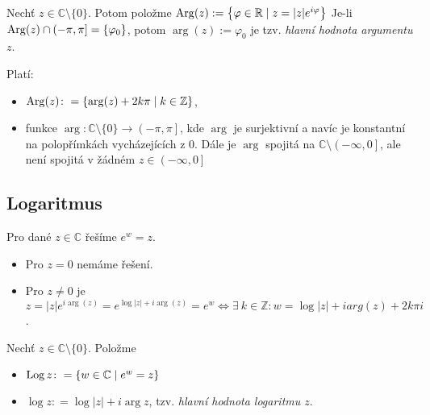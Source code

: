     \begin{notation}
          Nechť $z\in\mathbb{C}\setminus\{0\}$. Potom položme $\operatorname*{Arg}(z):=\left\{\varphi\in\mathbb{R}\mid z=\lvert z \rvert e^{i\varphi}\right\}$ Je-li $\operatorname*{Arg}(z) \cap  (-\pi,\pi]=\{\varphi_0\}$, potom $\arg(z):=\varphi_0$ je tzv. \emph{hlavní hodnota argumentu $z$}. %
    \end{notation}
     
         Platí: 
        \begin{itemize}
            \item $\operatorname*{Arg}(z)\colon = \{\arg(z)+2k\pi\mid k\in\mathbb{Z}\}$,
            \item funkce $\arg\colon \mathbb {C}\setminus\{0\} \to \left (-\pi,\pi\right ]$, kde $\arg$ je surjektivní a navíc je konstantní na polopřímkách vycházejících z $0$. Dále je $\arg$ spojitá na $\mathbb {C}\setminus\left (-\infty,0\right ]$, ale není spojitá v žádném $z\in \left (-\infty,0\right ]$
        \end{itemize}



\subsection{Logaritmus}
Pro dané $z\in\mathbb{C}$ řešíme $e^w=z$. 
\begin{itemize}
    \item Pro $z=0$ nemáme řešení. \item Pro $z\neq 0$ je $z=\lvert z \rvert e^{i  \arg(z)}=e^{\log\lvert z \rvert+i   \arg(z)}=e^w\iff\exists\ k \in\mathbb{Z}\colon w=\log \lvert z \rvert +i arg(z)+2k\pi i$.
    \end{itemize}

\begin{definition}
Nechť $z\in\mathbb{C}\setminus\{0\}$. Položme 
\begin{itemize}
    \item $\operatorname*{Log} z\colon=\{w\in\mathbb{C}\mid e^w=z\}$
    \item $\log z\colon= \log\lvert z \rvert + i \arg z$,  tzv. \emph{hlavní hodnota logaritmu $z$}.
\end{itemize}
\end{definition}

